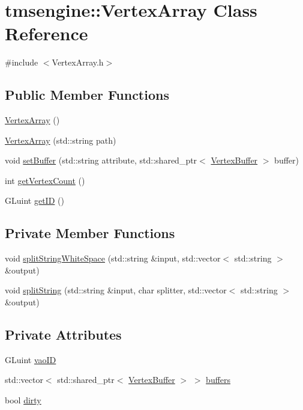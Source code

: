 \hypertarget{classtmsengine_1_1_vertex_array}{}\section{tmsengine\+:\+:Vertex\+Array Class Reference}
\label{classtmsengine_1_1_vertex_array}


{\ttfamily \#include $<$Vertex\+Array.\+h$>$}

\subsection*{Public Member Functions}
\begin{DoxyCompactItemize}
\item 
\hyperlink{classtmsengine_1_1_vertex_array_ab8a2dcce9698f96dac5f9a19c6979d03}{Vertex\+Array} ()
\item 
\hyperlink{classtmsengine_1_1_vertex_array_ad3790c015fab2f4ca0ac32b1782b7f33}{Vertex\+Array} (std\+::string path)
\item 
void \hyperlink{classtmsengine_1_1_vertex_array_aded817cf210e13abd10b92475718e3ef}{set\+Buffer} (std\+::string attribute, std\+::shared\+\_\+ptr$<$ \hyperlink{classtmsengine_1_1_vertex_buffer}{Vertex\+Buffer} $>$ buffer)
\item 
int \hyperlink{classtmsengine_1_1_vertex_array_abd774aebfb2cac21e6b5b769b24839ab}{get\+Vertex\+Count} ()
\item 
G\+Luint \hyperlink{classtmsengine_1_1_vertex_array_ab8d9e0c4130f9a0880be869c5f176285}{get\+ID} ()
\end{DoxyCompactItemize}
\subsection*{Private Member Functions}
\begin{DoxyCompactItemize}
\item 
void \hyperlink{classtmsengine_1_1_vertex_array_a35f3a952fe7089d2ebe71c6d4e2c2443}{split\+String\+White\+Space} (std\+::string \&input, std\+::vector$<$ std\+::string $>$ \&output)
\item 
void \hyperlink{classtmsengine_1_1_vertex_array_a0d589e02258c90f551011be850f180e4}{split\+String} (std\+::string \&input, char splitter, std\+::vector$<$ std\+::string $>$ \&output)
\end{DoxyCompactItemize}
\subsection*{Private Attributes}
\begin{DoxyCompactItemize}
\item 
G\+Luint \hyperlink{classtmsengine_1_1_vertex_array_a4a18394cce9fe71f003ab23721fba532}{vao\+ID}
\item 
std\+::vector$<$ std\+::shared\+\_\+ptr$<$ \hyperlink{classtmsengine_1_1_vertex_buffer}{Vertex\+Buffer} $>$ $>$ \hyperlink{classtmsengine_1_1_vertex_array_a39afaa4b9e37f5a8e107e82cab67e354}{buffers}
\item 
bool \hyperlink{classtmsengine_1_1_vertex_array_a9d53a5e75ce6c4afec5091ebeb17069f}{dirty}
\end{DoxyCompactItemize}


